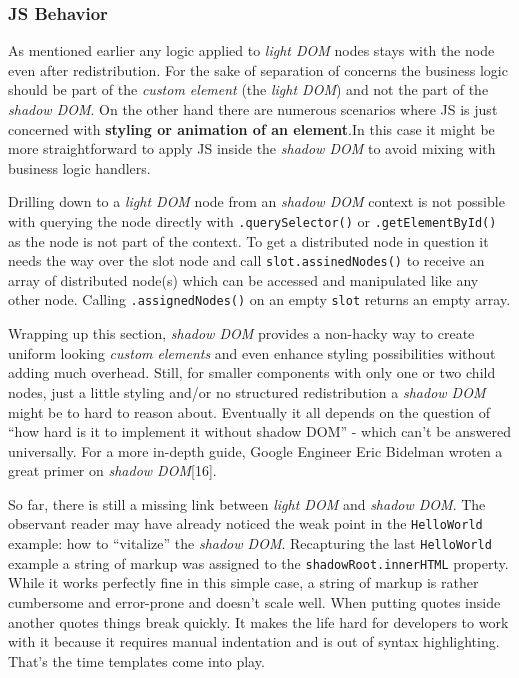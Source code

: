 \documentclass[]{article}
\begin{document}
\subsubsection{JS Behavior}\label{js-behavior}

As mentioned earlier any logic applied to \emph{light DOM} nodes stays
with the node even after redistribution. For the sake of separation of
concerns the business logic should be part of the \emph{custom element}
(the \emph{light DOM}) and not the part of the \emph{shadow DOM}. On the
other hand there are numerous scenarios where JS is just concerned with
\textbf{styling or animation of an element}.In this case it might be
more straightforward to apply JS inside the \emph{shadow DOM} to avoid
mixing with business logic handlers.

Drilling down to a \emph{light DOM} node from an \emph{shadow DOM}
context is not possible with querying the node directly with
\texttt{.querySelector()} or \texttt{.getElementById()} as the node is
not part of the context. To get a distributed node in question it needs
the way over the slot node and call \texttt{slot.assinedNodes()} to
receive an array of distributed node(s) which can be accessed and
manipulated like any other node. Calling \texttt{.assignedNodes()} on an
empty \texttt{slot} returns an empty array.

Wrapping up this section, \emph{shadow DOM} provides a non-hacky way to
create uniform looking \emph{custom elements} and even enhance styling
possibilities without adding much overhead. Still, for smaller
components with only one or two child nodes, just a little styling
and/or no structured redistribution a \emph{shadow DOM} might be to hard
to reason about. Eventually it all depends on the question of ``how hard
is it to implement it without shadow DOM'' - which can't be answered
universally. For a more in-depth guide, Google Engineer Eric Bidelman
wroten a great primer on \emph{shadow DOM}{[}16{]}.

So far, there is still a missing link between \emph{light DOM} and
\emph{shadow DOM}. The observant reader may have already noticed the
weak point in the \texttt{HelloWorld} example: how to ``vitalize'' the
\emph{shadow DOM}. Recapturing the last \texttt{HelloWorld} example a
string of markup was assigned to the \texttt{shadowRoot.innerHTML}
property. While it works perfectly fine in this simple case, a string of
markup is rather cumbersome and error-prone and doesn't scale well. When
putting quotes inside another quotes things break quickly. It makes the
life hard for developers to work with it because it requires manual
indentation and is out of syntax highlighting. That's the time templates
come into play.
\end{document}
